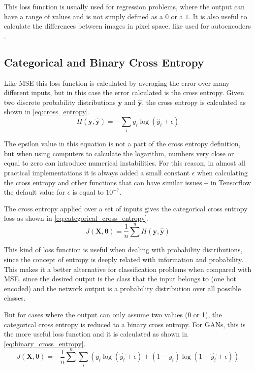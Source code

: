 This loss function is usually used for regression problems, where the output can have a range of values and is not simply defined as a $0$ or a $1$. It is also useful to calculate the differences between images in pixel space, like used for autoencoders \cite{autoencoder1991}.


\subsection{Categorical and Binary Cross Entropy} \label{sub:cross_entropy}
Like \gls{MSE} this loss function is calculated by averaging the error over many different inputs, but in this case the error calculated is the cross entropy. Given two discrete probability distributions $\bm{y}$ and $\hat{\bm{y}}$, the cross entropy is calculated as shown in \autoref{eq:cross_entropy}.
\begin{equation}  \label{eq:cross_entropy}
    H(\bm{y}, \hat{\bm{y}}) = -\sum_{i}{y_i\log(\hat{y}_i + \epsilon)}
\end{equation}

The \gls{epsilon} value in this equation is not a part of the cross entropy definition, but when using computers to calculate the logarithm, numbers very close or equal to zero can introduce numerical instabilities. For this reason, in almost all practical implementations it is always added a small constant $\epsilon$ when calculating the cross entropy and other functions that can have similar issues \textbf{--} in Tensorflow \cite{tensorflow2015} the default value for $\epsilon$ is equal to $10^{-7}$.

The cross entropy applied over a set of inputs gives the categorical cross entropy loss as shown in \autoref{eq:categorical_cross_entropy}.
\begin{equation} \label{eq:categorical_cross_entropy}
    J(\bm{X}, \bm{\theta}) = \frac{1}{n}\sum^{n}{ H(\bm{y}, \hat{\bm{y}}) }
\end{equation}

This kind of loss function is useful when dealing with probability distributions, since the concept of entropy is deeply related with information and probability. This makes it a better alternative for classification problems when compared with \gls{MSE}, since the desired output is the class that the input belongs to (one hot encoded) and the network output is a probability distribution over all possible classes. 

But for cases where the output can only assume two values (0 or 1), the categorical cross entropy is reduced to a binary cross entropy. For \acp{GAN}, this is the more useful loss function and it is calculated as shown in \autoref{eq:binary_cross_entropy}.
\begin{equation} \label{eq:binary_cross_entropy}
    J(\bm{X}, \bm{\theta}) = -\frac{1}{n}\sum^{n}\sum_{i}{
        \left( y_i\log(\hat{y_i} + \epsilon) + (1 - y_i) \log(1 - \hat{y_i} + \epsilon) \right)
    }
\end{equation}



